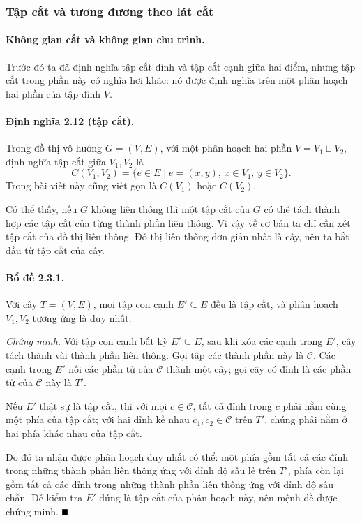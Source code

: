 \documentclass[11pt]{article}
\providecommand{\square}{\mathord{\vcenter{\hrule height .6em width .6em}}}
\begin{document}
\subsubsection{Tập cắt và tương đương theo lát cắt}

\paragraph{Không gian cắt và không gian chu trình.}
Trước đó ta đã định nghĩa tập cắt đỉnh và tập cắt cạnh giữa hai điểm, nhưng tập
cắt trong phần này có nghĩa hơi khác: nó được định nghĩa trên một phân hoạch hai
phần của tập đỉnh $V$.

\paragraph{Định nghĩa 2.12 (tập cắt).}
Trong đồ thị vô hướng $G=(V,E)$, với một phân hoạch hai phần
$V=V_1\sqcup V_2$, định nghĩa tập cắt giữa $V_1,V_2$ là
\[
C(V_1,V_2)=\{e\in E\mid e=(x,y),\,x\in V_1,\,y\in V_2\}.
\]
Trong bài viết này cũng viết gọn là $C(V_1)$ hoặc $C(V_2)$.

Có thể thấy, nếu $G$ không liên thông thì một tập cắt của $G$ có thể tách thành
hợp các tập cắt của từng thành phần liên thông. Vì vậy về cơ bản ta chỉ cần xét
tập cắt của đồ thị liên thông. Đồ thị liên thông đơn giản nhất là cây, nên ta
bắt đầu từ tập cắt của cây.

\paragraph{Bổ đề 2.3.1.}
Với cây $T=(V,E)$, mọi tập con cạnh $E'\subseteq E$ đều là tập cắt, và phân
hoạch $V_1,V_2$ tương ứng là duy nhất.

\emph{Chứng minh.}
Với tập con cạnh bất kỳ $E'\subseteq E$, sau khi xóa các cạnh trong $E'$, cây
tách thành vài thành phần liên thông. Gọi tập các thành phần này là $\mathcal C$.
Các cạnh trong $E'$ nối các phần tử của $\mathcal C$ thành một cây; gọi cây có
đỉnh là các phần tử của $\mathcal C$ này là $T'$.

Nếu $E'$ thật sự là tập cắt, thì với mọi $c\in\mathcal C$, tất cả đỉnh trong
$c$ phải nằm cùng một phía của tập cắt; với hai đỉnh kề nhau $c_1,c_2\in
\mathcal C$ trên $T'$, chúng phải nằm ở hai phía khác nhau của tập cắt.

Do đó ta nhận được phân hoạch duy nhất có thể: một phía gồm tất cả các đỉnh
trong những thành phần liên thông ứng với đỉnh độ sâu lẻ trên $T'$, phía còn
lại gồm tất cả các đỉnh trong những thành phần liên thông ứng với đỉnh độ sâu
chẵn. Dễ kiểm tra $E'$ đúng là tập cắt của phân hoạch này, nên mệnh đề được
chứng minh. \hfill$\square$
\end{document}
